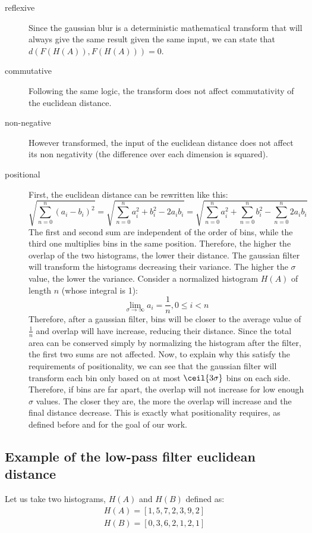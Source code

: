 \begin{description}
  \item[reflexive] Since the gaussian blur is a deterministic mathematical transform that will always give the same result given the same input, we can state that \\
    $d(F(H(A)), F(H(A))) = 0$.
  \item[commutative] Following the same logic, the transform does not affect commutativity of the euclidean distance.
  \item[non-negative]
    However transformed, the input of the euclidean distance does not affect its non negativity (the difference over each dimension is squared).
  \item[positional] First, the euclidean distance can be rewritten like this:
    $$\sqrt{\sum_{n=0}^{n} (a_i-b_i)^2} = \sqrt{\sum_{n=0}^{n} a_i^2+b_i^2-2a_ib_i} = \sqrt{\sum_{n=0}^{n} a_i^2 + \sum_{n=0}^{n} b_i^2 - \sum_{n=0}^{n} 2a_ib_i}$$
    The first and second sum are independent of the order of bins, while the third one multiplies bins in the same position. Therefore, the higher the overlap of the two histograms, the lower their distance. The gaussian filter will transform the histograms decreasing their variance. The higher the $\sigma$ value, the lower the variance. Consider a normalized histogram $H(A)$ of length $n$ (whose integral is 1):
      $$\lim_{\sigma\to\infty} a_i = \frac{1}{n}, 0 \leq i < n $$
      Therefore, after a gaussian filter, bins will be closer to the average value of $\frac{1}{n}$ and overlap will have increase, reducing their distance. Since the total area can be conserved simply by normalizing the histogram after the filter, the first two sums are not affected.
      Now, to explain why this satisfy the requirements of positionality, we can see that the gaussian filter will transform each bin only based on at most $\ceil{3\sigma}$ bins on each side. Therefore, if bins are far apart, the overlap will not increase for low enough $\sigma$ values. The closer they are, the more the overlap will increase and the final distance decrease. This is exactly what positionality requires, as defined before and for the goal of our work.
\end{description}

\subsection{Example of the low-pass filter euclidean distance}

Let us take two histograms, $H(A)$ and $H(B)$ defined as:
\begin{align}
  H(A) = [1,5,7,2,3,9,2]\\
  H(B) = [0,3,6,2,1,2,1]
\end{align}

